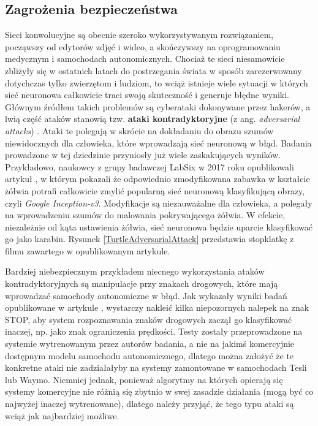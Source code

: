 \subsection{Zagrożenia bezpieczeństwa}
Sieci konwolucyjne są obecnie szeroko wykorzystywanym rozwiązaniem, począwszy od edytorów zdjęć i wideo, a skończywszy na oprogramowaniu medycznym i samochodach autonomicznych. Chociaż te sieci niesamowicie zbliżyły się w ostatnich latach do postrzegania świata w sposób zarezerwowany dotychczas tylko zwierzętom i ludziom, to wciąż istnieje wiele sytuacji w których sieć neuronowa całkowicie traci swoją skuteczność i generuje błędne wyniki. Głównym źródłem takich problemów są cyberataki dokonywane przez hakerów, a lwią część ataków stanowią tzw. \textbf{ataki kontradyktoryjne} (z ang. \textit{adversarial attacks}) \cite{dickson:adversarialMl}. Ataki te polegają w skrócie na dokładaniu do obrazu szumów niewidocznych dla człowieka, które wprowadzają sieć neuronową w błąd. Badania prowadzone w tej dziedzinie przyniosły już wiele zaskakujących wyników. Przykładowo, naukowcy z grupy badawczej LabSix w 2017 roku opublikowali artykuł \cite{labsix:foolingNNs}, w którym pokazali że odpowiednio zmodyfikowana zabawka w kształcie żółwia potrafi całkowicie zmylić popularną sieć neuronową klasyfikującą obrazy, czyli \textit{Google Inception-v3}. Modyfikacje są niezauważalne dla człowieka, a polegały na wprowadzeniu szumów do malowania pokrywającego żółwia. W efekcie, niezależnie od kąta ustawienia żółwia, sieć neuronowa będzie uparcie klasyfikować go jako karabin. Rysunek \ref{TurtleAdversarialAttack} przedstawia stopklatkę z filmu zawartego w opublikowanym artykule.

Bardziej niebezpiecznym przykładem niecnego wykorzystania ataków kontradyktoryjnych są manipulacje przy znakach drogowych, które mają wprowadzać samochody autonomiczne w błąd. Jak wykazały wyniki badań opublikowane w artykule \cite{adversarial:roadSignAttacks}, wystarczy nakleić kilka niepozornych nalepek na znak STOP, aby system rozpoznawania znaków drogowych zaczął go klasyfikować inaczej, np. jako znak ograniczenia prędkości. Testy zostały przeprowadzone na systemie wytrenowanym przez autorów badania, a nie na jakimś komercyjnie dostępnym modelu samochodu autonomicznego, dlatego można założyć że te konkretne ataki nie zadziałałyby na systemy zamontowane w samochodach Tesli lub Waymo. Niemniej jednak, ponieważ algorytmy na których opierają się systemy komercyjne nie różnią się zbytnio w swej zasadzie działania (mogą być co najwyżej inaczej wytrenowane), dlatego należy przyjąć, że tego typu ataki są wciąż jak najbardziej możliwe. \\

